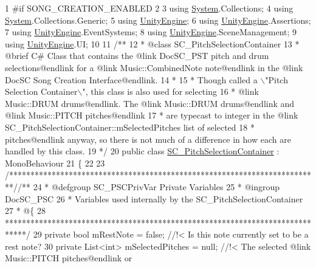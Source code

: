 \begin{DoxyCodeInclude}
1 \textcolor{preprocessor}{#if SONG\_CREATION\_ENABLED}
2 
3 \textcolor{keyword}{using} \hyperlink{namespace_system}{System}.Collections;
4 \textcolor{keyword}{using} \hyperlink{namespace_system}{System}.Collections.Generic;
5 \textcolor{keyword}{using} \hyperlink{namespace_unity_engine}{UnityEngine};
6 \textcolor{keyword}{using} \hyperlink{namespace_unity_engine}{UnityEngine}.Assertions;
7 \textcolor{keyword}{using} \hyperlink{namespace_unity_engine}{UnityEngine}.EventSystems;
8 \textcolor{keyword}{using} \hyperlink{namespace_unity_engine}{UnityEngine}.SceneManagement;
9 \textcolor{keyword}{using} \hyperlink{namespace_unity_engine}{UnityEngine}.UI;
10 \textcolor{comment}{}
11 \textcolor{comment}{/**}
12 \textcolor{comment}{ * @class SC\_PitchSelectionContainer }
13 \textcolor{comment}{ * @brief C# Class that contains the @link DocSC\_PST pitch and drum selections@endlink for a @link
       Music::CombinedNote note@endlink in the @link DocSC Song Creation Interface@endlink.}
14 \textcolor{comment}{ * }
15 \textcolor{comment}{ * Though called a \(\backslash\)"Pitch Selection Container\(\backslash\)", this class is also used for selecting}
16 \textcolor{comment}{ * @link Music::DRUM drums@endlink. The @link Music::DRUM drums@endlink and @link Music::PITCH
       pitches@endlink }
17 \textcolor{comment}{ * are typecast to integer in the @link SC\_PitchSelectionContainer::mSelectedPitches list of selected}
18 \textcolor{comment}{ * pitches@endlink anyway, so there is not much of a difference in how each are handled by this class. }
19 \textcolor{comment}{*/}
20 \textcolor{keyword}{public} \textcolor{keyword}{class }\hyperlink{class_s_c___pitch_selection_container}{SC\_PitchSelectionContainer} : MonoBehaviour
21 \{
22 
23     \textcolor{comment}{/*************************************************************************/}\textcolor{comment}{/** }
24 \textcolor{comment}{     * @defgroup SC\_PSCPrivVar Private Variables}
25 \textcolor{comment}{     * @ingroup DocSC\_PSC}
26 \textcolor{comment}{     * Variables used internally by the SC\_PitchSelectionContainer}
27 \textcolor{comment}{     * @\{}
28 \textcolor{comment}{    *****************************************************************************/}
29     \textcolor{keyword}{private} \textcolor{keywordtype}{bool} mRestNote = \textcolor{keyword}{false}; \textcolor{comment}{//!< Is this note currently set to be a rest note?}
30 \textcolor{comment}{}    \textcolor{keyword}{private} List<int> mSelectedPitches = null; \textcolor{comment}{//!< The selected @link Music::PITCH pitches@endlink or
}
\end{DoxyCodeInclude}
